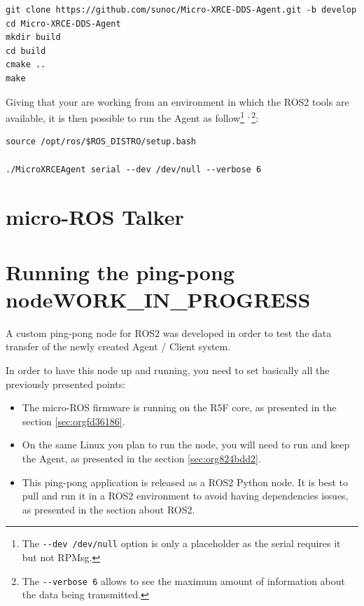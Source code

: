 \documentclass[10pt]{article}
\begin{document}
\begin{verbatim}
git clone https://github.com/sunoc/Micro-XRCE-DDS-Agent.git -b develop
cd Micro-XRCE-DDS-Agent
mkdir build
cd build
cmake ..
make
\end{verbatim}

Giving that your are working from an environment in which the ROS2 tools are available, it is then possible
to run the Agent as follow\footnote{The \texttt{-{}-{}dev /dev/null} option is only a placeholder as the serial requires it but not RPMsg.} \textsuperscript{,}\,\footnote{The \texttt{-{}-{}verbose 6} allows to see the maximum amount of information about the data being transmitted.}:

\begin{verbatim}
source /opt/ros/$ROS_DISTRO/setup.bash

./MicroXRCEAgent serial --dev /dev/null --verbose 6
\end{verbatim}


\clearpage
\section{micro-ROS Talker}
\label{sec:org4bd352b}

\clearpage
\section{Running the ping-pong node\hfill{}\textsc{WORK\_IN\_PROGRESS}}
\label{sec:orgd085b32}
A custom ping-pong node for ROS2 was developed in order to test the data transfer of the newly created
Agent / Client system.

In order to have this node up and running, you need to set basically all the previously presented points:
\begin{itemize}
\item The micro-ROS firmware is running on the R5F core, as presented in the section \ref{sec:orgfd36186}.
\item On the same Linux you plan to run the node, you will need to run and keep the Agent, as presented
in the section \ref{sec:org824bdd2}.
\item This ping-pong application is released as a ROS2 Python node. It is best to pull and run it
in a ROS2 environment to avoid having dependencies issues, as presented in the section about ROS2.

\clearpage
\end{itemize}
\end{document}
